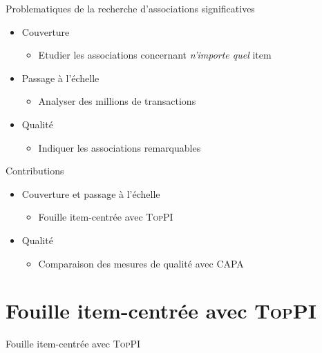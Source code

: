 \documentclass[table]{beamer}
\providecommand{\toppi}{\mbox{\textsc{TopPI}}}
\providecommand{\capa}{\mbox{\textsc{CAPA}} }
\begin{document}
\begin{frame}{Problematiques de la recherche d'associations significatives}
  \begin{itemize}
    \item Couverture
      \begin{itemize}
        \item Etudier les associations concernant {\em n'importe quel} item
      \end{itemize}
    \vspace{1em}
    \item Passage à l'échelle
      \begin{itemize}
        \item Analyser des millions de transactions
      \end{itemize}
    \vspace{1em}
    \item Qualité
      \begin{itemize}
        \item Indiquer les associations remarquables
      \end{itemize}
  \end{itemize}
\end{frame}


\begin{frame}{Contributions}
  \begin{itemize}
    \item Couverture et passage à l'échelle
      \begin{itemize}
        \item Fouille item-centrée avec \toppi
      \end{itemize}
    \vspace{1em}
    \item Qualité
      \begin{itemize}
        \item Comparaison des mesures de qualité avec \capa
      \end{itemize}
  \end{itemize}
\end{frame}






\section{Fouille item-centrée avec \toppi}

{
\begin{frame}{}
  Fouille item-centrée avec \toppi
\end{frame}
}
\end{document}
